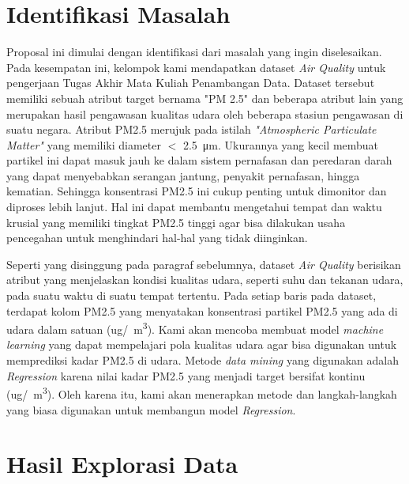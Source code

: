 \documentclass{article}
\begin{document}
    \begin{normalsize}
        
        \section{Identifikasi Masalah}
        Proposal ini dimulai dengan identifikasi dari masalah yang ingin diselesaikan. 
        Pada kesempatan ini, kelompok kami mendapatkan dataset \textit{Air Quality} 
        untuk pengerjaan Tugas Akhir Mata Kuliah Penambangan Data. Dataset tersebut memiliki 
        sebuah atribut target bernama "PM 2.5" dan beberapa atribut lain yang merupakan hasil 
        pengawasan kualitas udara oleh beberapa stasiun pengawasan di suatu negara. Atribut 
        PM2.5 merujuk pada istilah \textit{"Atmospheric Particulate Matter"} yang memiliki
        diameter $<$ \SI{2.5}{\micro\metre}. Ukurannya yang kecil membuat partikel ini dapat 
        masuk jauh ke dalam sistem pernafasan dan peredaran darah yang dapat menyebabkan 
        serangan jantung, penyakit pernafasan, hingga kematian. Sehingga konsentrasi PM2.5
        ini cukup penting untuk dimonitor dan diproses lebih lanjut. Hal ini dapat membantu 
        mengetahui tempat dan waktu krusial yang memiliki tingkat PM2.5 tinggi agar bisa
        dilakukan usaha pencegahan untuk menghindari hal-hal yang tidak diinginkan.

        \noindent Seperti yang disinggung pada paragraf sebelumnya, dataset \textit{Air Quality}
        berisikan atribut yang menjelaskan kondisi kualitas udara, seperti suhu dan tekanan udara,
        pada suatu waktu di suatu tempat tertentu. Pada setiap baris pada dataset, terdapat kolom
        PM2.5 yang menyatakan konsentrasi partikel PM2.5 yang ada di udara dalam satuan 
        (ug/\SI{}{\metre\cubed}). Kami akan mencoba membuat model \textit{machine learning} yang 
        dapat mempelajari pola kualitas udara agar bisa digunakan untuk memprediksi kadar PM2.5 
        di udara. Metode \textit{data mining} yang digunakan adalah \textit{Regression} karena 
        nilai kadar PM2.5 yang menjadi target bersifat kontinu (ug/\SI{}{\metre\cubed}). Oleh
        karena itu, kami akan menerapkan metode dan langkah-langkah yang biasa digunakan untuk
        membangun model \textit{Regression}.

        \section{Hasil Explorasi Data}
        

\end{normalsize}
\end{document}
